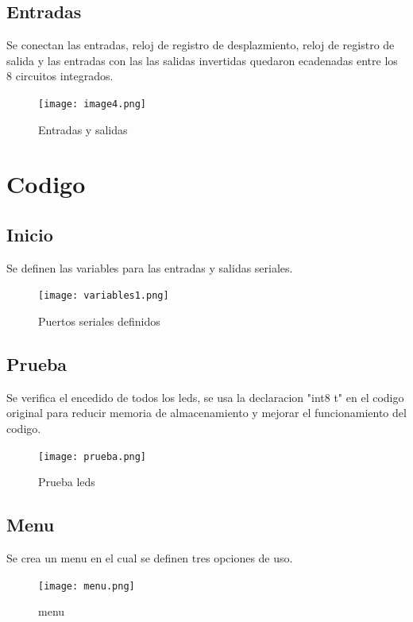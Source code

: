 \documentclass{article}
\begin{document}
\subsection{Entradas}
Se conectan las entradas, reloj de registro de desplazmiento, reloj de registro de salida y las entradas con las las salidas invertidas quedaron ecadenadas entre los 8 circuitos integrados.\cite{datasheet}
    \begin{figure}[h]
    \texttt{[image: image4.png]}
    \centering
    \caption{Entradas y salidas}
    \label{fig:image4}
    \end{figure}

\section{Codigo} 
\label{Elaboracion}
\subsection{Inicio}
Se definen las variables para las entradas y salidas seriales.
    \begin{figure}[h]
    \texttt{[image: variables1.png]}
    \centering
    \caption{Puertos seriales definidos}
    \label{fig:variables1}
    \end{figure}

\subsection{Prueba}
Se verifica el encedido de todos los leds, se usa la declaracion "int8 t" en el codigo original para reducir memoria de almacenamiento y mejorar el funcionamiento del codigo.
    \begin{figure}[h]
    \texttt{[image: prueba.png]}
    \centering
    \caption{Prueba leds}
    \label{fig:prueba}
    \end{figure}

\subsection{Menu}
Se crea un menu en el cual se definen tres opciones de uso.
    \begin{figure}[h]
    \texttt{[image: menu.png]}
    \centering
    \caption{menu}
    \label{fig:menu}
    \end{figure}
\end{document}

